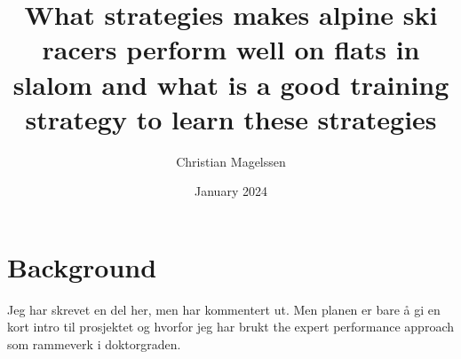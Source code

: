 \documentclass{report}
\title{What strategies makes alpine ski racers perform well on flats in slalom and what is a good training strategy to learn these strategies}
\author{Christian Magelssen}
\date{January 2024}
\begin{document}
\maketitle

\chapter{Background}

Jeg har skrevet en del her, men har kommentert ut. Men planen er bare å gi en kort intro til prosjektet og hvorfor jeg har brukt the expert performance approach som rammeverk i doktorgraden. 







\end{document}
